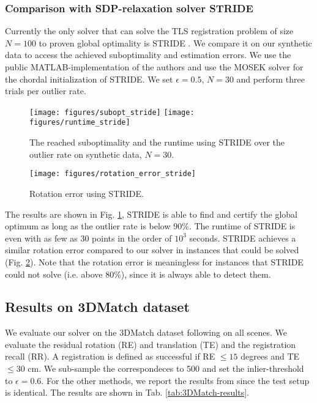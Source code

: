\subsubsection{Comparison with SDP-relaxation solver STRIDE} Currently the only solver that can solve the TLS registration problem of size $N=100$ to proven global optimality is STRIDE \cite{9785843}. We compare it on our synthetic data to access the achieved suboptimality and estimation errors. We use the public MATLAB-implementation of the authors and use the MOSEK solver for the chordal initialization of STRIDE.
We set $\epsilon = 0.5$, $N=30$ and perform three trials per outlier rate.

\begin{figure}[!ht]
	\centering
	\texttt{[image: figures/subopt\_stride]}
	\texttt{[image: figures/runtime\_stride]}
	\caption{The reached suboptimality and the runtime using STRIDE over the outlier rate on synthetic data, $N=30$.}
	\label{fig:stride-subopt-eval}
\end{figure}
\begin{figure}[!ht]
	\centering
	\texttt{[image: figures/rotation\_error\_stride]}
	\caption{Rotation error using STRIDE.}
	\label{fig:stride-rot-err}
\end{figure}

The results are shown in Fig. \ref{fig:stride-subopt-eval}, STRIDE is able to find and certify the global optimum as long as the outlier rate is below 90\%. The runtime of STRIDE is even with as few as 30 points in the order of $10^3$ seconds. STRIDE achieves a similar rotation error compared to our solver in instances that could be solved (Fig. \ref{fig:stride-rot-err}). Note that the rotation error is meaningless for instances that STRIDE could not solve (i.e. above 80\%), since it is always able to detect them.

\subsection{Results on 3DMatch dataset}

We evaluate our solver on the 3DMatch dataset \cite{zeng20163dmatch} 
following \cite{SC2-PCR-Chen-2022-CVPR, zhang20233d} on all scenes. We evaluate the residual rotation (RE) and translation (TE) and the registration recall (RR). A registration is defined as successful if RE $\leq 15$ degrees and TE $\leq 30$ cm. We sub-sample the correspondeces to 500 and set the inlier-threshold to $\epsilon = 0.6$. For the other methods, we report the results from \cite{zhang20233d} since the test setup is identical. The results are shown in Tab. \ref{tab:3DMatch-results}.

